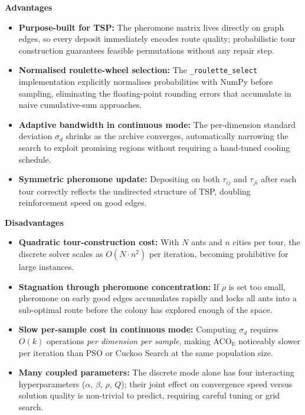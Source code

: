 \textbf{Advantages}

\begin{itemize}
  \item \textbf{Purpose-built for TSP:} The pheromone matrix lives directly on graph edges,
        so every deposit immediately encodes route quality; probabilistic tour construction
        guarantees feasible permutations without any repair step.
  \item \textbf{Normalised roulette-wheel selection:} The \texttt{\_roulette\_select}
        implementation explicitly normalises probabilities with NumPy before sampling,
        eliminating the floating-point rounding errors that accumulate in naive cumulative-sum
        approaches.
  \item \textbf{Adaptive bandwidth in continuous mode:} The per-dimension standard deviation
        $\sigma_d$ shrinks as the archive converges, automatically narrowing the search to
        exploit promising regions without requiring a hand-tuned cooling schedule.
  \item \textbf{Symmetric pheromone update:} Depositing on both $\tau_{ij}$ and $\tau_{ji}$
        after each tour correctly reflects the undirected structure of TSP, doubling
        reinforcement speed on good edges.
\end{itemize}

\textbf{Disadvantages}

\begin{itemize}
  \item \textbf{Quadratic tour-construction cost:} With $N$ ants and $n$ cities per tour, the
        discrete solver scales as $O(N\cdot n^2)$ per iteration, becoming prohibitive for
        large instances.
  \item \textbf{Stagnation through pheromone concentration:} If $\rho$ is set too small,
        pheromone on early good edges accumulates rapidly and locks all ants into a sub-optimal
        route before the colony has explored enough of the space.
  \item \textbf{Slow per-sample cost in continuous mode:} Computing $\sigma_d$ requires
        $O(k)$ operations \emph{per dimension per sample}, making ACO$_\mathbb{R}$ noticeably
        slower per iteration than PSO or Cuckoo Search at the same population size.
  \item \textbf{Many coupled parameters:} The discrete mode alone has four interacting
        hyperparameters ($\alpha$, $\beta$, $\rho$, $Q$); their joint effect on convergence
        speed versus solution quality is non-trivial to predict, requiring careful tuning or
        grid search.
\end{itemize}

